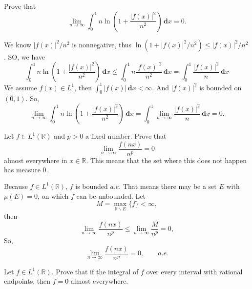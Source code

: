 \documentclass[12pt]{article}
\newenvironment{exercise}[1]{\begin{tcolorbox}[colback=black!15, colframe=black!80, breakable, title=#1]}{\end{tcolorbox}}
\newenvironment{solution}{\begin{tcolorbox}[colback=white, colframe=black!50, breakable, title=Solution. ]\setlength{\parskip}{0.8em}}{\end{tcolorbox}}
\newcommand{\der}{\,\mathbf{d}}
\begin{document}
    \begin{exercise}{9}
        Prove that 
        \[
            \lim_{n\to \infty}\int_0^1 n\ln(1+\frac{|f(x)|^2}{n^2})\der x=0. 
        \]
    \end{exercise}

    \begin{solution}
        We know $|f(x)|^2/n^2$ is nonnegative, thus $\ln(1+|f(x)|^2/n^2)\leqslant |f(x)|^2/n^2$. SO, we have
        \[
            \int_0^1n\ln(1+\frac{|f(x)|^2}{n^2})\der x\leqslant \int_0^1n\frac{|f(x)|^2}{n^2}\der x=\int_0^1\frac{|f(x)|^2}{n}\der x
        \]
        We assume $f(x)\in L^1$, then $\int_0^1|f(x)|\der x<\infty$. And $|f(x)|^2$ is bounded on $(0,1)$. So, 
        \[
            \lim_{n\to \infty}\int_0^1 n\ln(1+\frac{|f(x)|^2}{n^2})\der x=\int_0^1\lim_{n\to \infty}\frac{|f(x)|^2}{n}\der x=0. 
        \]
    \end{solution}

    \begin{exercise}{10}
        Let $f \in L^1(\mathbb{R})$ and $p > 0$ a fixed number. Prove that
        \[
            \lim_{n\to\infty}\frac{f(nx)}{n^p}=0
        \]
        almost everywhere in $x \in \mathbb{R}$. This means that the set where this does not happen has measure 0. 
    \end{exercise}

    \begin{solution}
        Because $f\in L^1(\mathbb{R})$, $f$ is bounded $a.e$. That means there may be a set $E$ with $\mu(E)=0$, on which $f$ can be unbounded. Let 
        \[
            M=\max_{\mathbb{R}\backslash E}\{f\}<\infty, 
        \]
        then
        \[
            \lim_{n\to\infty}\frac{f(nx)}{n^p}\leqslant\lim_{n\to\infty}\frac{M}{n^p}=0, 
        \]
        So, 
        \[
            \lim_{n\to\infty}\frac{f(nx)}{n^p}=0, \qquad a.e. 
        \]
    \end{solution}

    \begin{exercise}{11}
        Let $f \in L^1(\mathbb{R})$. Prove that if the integral of $f$ over every interval with rational endpoints, then $f = 0$ almost everywhere. 
    \end{exercise}
\end{document}
